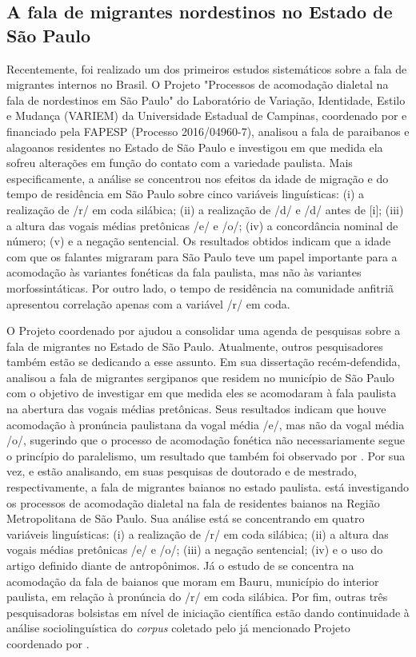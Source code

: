 \documentclass[
    a4paper,	%
    12pt,	%
    ]{article}	%
\begin{document}
	\subsection{A fala de migrantes nordestinos no Estado de São Paulo}
	\label{estudos-sp}

Recentemente, foi realizado um dos primeiros estudos sistemáticos sobre a fala
de migrantes internos no Brasil. O Projeto "Processos de acomodação dialetal na
fala de nordestinos em São Paulo" do Laboratório de Variação, Identidade, Estilo
e Mudança (VARIEM) da Universidade Estadual de Campinas, coordenado por
\citet{Oushiro2018} e financiado pela FAPESP (Processo 2016/04960-7), analisou a
fala de paraibanos e alagoanos residentes no Estado de São Paulo e investigou em
que medida ela sofreu alterações em função do contato com a variedade paulista.
Mais especificamente, a análise se concentrou nos efeitos da idade de migração e
do tempo de residência em São Paulo sobre cinco variáveis linguísticas: (i) a
realização de /r/ em coda silábica; (ii) a realização de /d/ e /d/ antes de [i];
(iii) a altura das vogais médias pretônicas /e/ e /o/; (iv) a concordância
nominal de número; (v) e a negação sentencial. Os resultados obtidos indicam que
a idade com que os falantes migraram para São Paulo teve um papel importante
para a acomodação às variantes fonéticas da fala paulista, mas não às variantes
morfossintáticas. Por outro lado, o tempo de residência na comunidade anfitriã
apresentou correlação apenas com a variável /r/ em coda.

O Projeto coordenado por \citet{Oushiro2018} ajudou a consolidar uma agenda de
pesquisas sobre a fala de migrantes no Estado de São Paulo. Atualmente, outros
pesquisadores também estão se dedicando a esse assunto. Em sua dissertação
recém-defendida, \citet{Santana2019} analisou a fala de migrantes sergipanos que
residem no município de São Paulo com o objetivo de investigar em que medida
eles se acomodaram à fala paulista na abertura das vogais médias pretônicas.
Seus resultados indicam que houve acomodação à pronúncia paulistana da vogal
média /e/, mas não da vogal média /o/, sugerindo que o processo de acomodação
fonética não necessariamente segue o princípio do paralelismo, um resultado que
também foi observado por \citet{Oushiro2019}. Por sua vez, \citet{Souza2017} e
\citet{Oliveira2019} estão analisando, em suas pesquisas de doutorado e de
mestrado, respectivamente, a fala de migrantes baianos no estado paulista.
\citet{Souza2017} está investigando os processos de acomodação dialetal na fala
de residentes baianos na Região Metropolitana de São Paulo. Sua análise está se
concentrando em quatro variáveis linguísticas: (i) a realização de /r/ em coda
silábica; (ii) a altura das vogais médias pretônicas /e/ e /o/; (iii) a negação
sentencial; (iv) e o uso do artigo definido diante de antropônimos. Já o estudo
de \citet{Oliveira2019} se concentra na acomodação da fala de baianos que moram
em Bauru, município do interior paulista, em relação à pronúncia do /r/ em coda
silábica. Por fim, outras três pesquisadoras bolsistas em nível de iniciação
científica estão dando continuidade à análise sociolinguística do \emph{corpus}
coletado pelo já mencionado Projeto coordenado por \citet{Oushiro2018}.
\end{document}
